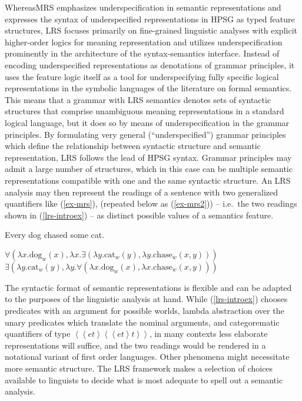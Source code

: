 \documentclass[output=paper
 	        ,biblatex
                ,babelshorthands
                ,newtxmath
                ,draftmode
                ,colorlinks, citecolor=brown
]{langscibook}
\begin{document}
Whereas\indexlrsstart MRS emphasizes underspecification in semantic representations and expresses the syntax of underspecified representations in HPSG as typed feature structures, LRS focuses primarily on fine-grained linguistic analyses with explicit higher-order logics for meaning representation and utilizes underspecification prominently in the architecture of the syntax-semantics interface. Instead of encoding underspecified representations as denotations of grammar principles, it uses the feature logic itself as a tool for underspecifying fully specific logical representations in the symbolic languages of the literature on formal semantics. This means that a grammar with LRS semantics denotes sets of syntactic structures that comprise unambiguous meaning representations in a standard logical language, but it does so by means of underspecification in the grammar principles. By formulating very general (``underspecified'') grammar principles which define the relationship between syntactic structure and semantic representation, LRS follows the lead of HPSG syntax.
Grammar principles may admit a large number of structures, which in this case can be multiple semantic representations compatible with one and the same syntactic structure. An LRS analysis may then represent the readings of a sentence with two generalized quantifiers like (\ref{ex-mrs}),  (repeated below as (\ref{ex-mrs2})) -- i.e.\ the two readings shown in (\ref{lrs-introex}) -- as distinct possible values of a semantics feature. 


\ea
\label{ex-mrs2}
Every dog chased some cat.
\z

\eal
\label{lrs-introex}
\ex\label{lrs-introex1a}
  
  $\forall \left(\lambda x.\text{dog}_w(x),\lambda x.\exists \left(\lambda y.\text{cat}_w(y),\lambda y.\text{chase}_w(x,y)\right)\right)$ 
\ex\label{lrs-introex1b}
  $\exists \left(\lambda y.\text{cat}_w(y),\lambda y.\forall \left(\lambda x.\text{dog}_w(x),\lambda x.\text{chase}_w(x,y)\right)\right)$ 
\zl


The syntactic format of semantic representations is flexible and can be adapted to the purposes of the linguistic analysis at hand. While (\ref{lrs-introex}) chooses predicates with an argument for possible worlds, lambda abstraction over the unary predicates which translate the nominal arguments, and categorematic quantifiers of type ${\left<\left<et\right>\left<\left<et\right>t\right>\right>}$, in many contexts less elaborate representations will suffice, and the two readings would be rendered in a notational variant of first order languages. Other phenomena might necessitate more semantic structure. The LRS framework makes a selection of choices available to linguists to decide what is most adequate to spell out a semantic analysis.
\end{document}

